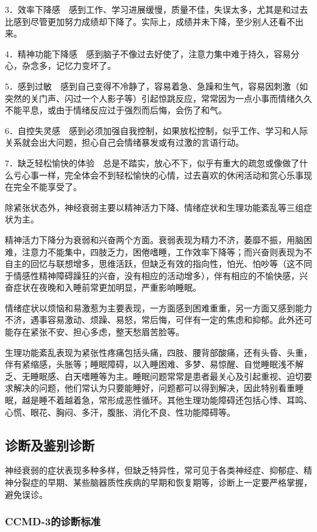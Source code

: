 3．效率下降感　感到工作、学习进展缓慢，质量不佳，失误太多，尤其是和过去比感到尽管更加努力成绩却下降了。实际上，成绩并未下降，至少别人还看不出来。

4．精神功能下降感　感到脑子不像过去好使了，注意力集中难于持久，容易分心，杂念多，记忆力变坏了。

5．感到过敏　感到自己变得不冷静了，容易着急、急躁和生气，容易因刺激（如突然的关门声、闪过一个人影子等）引起惊跳反应，常常因为一点小事而情绪久久不能平息，或由于情绪反应过于强烈而后悔，会伤了和气。

6．自控失灵感　感到必须加强自我控制，如果放松控制，似乎工作、学习和人际关系就会出大问题，担心自己会情绪暴发或有过激的言语行动。

7．缺乏轻松愉快的体验　总是不踏实，放心不下，似乎有重大的疏忽或像做了什么亏心事一样，完全体会不到轻松愉快的心情，过去喜欢的休闲活动和赏心乐事现在完全不能享受了。

除紧张状态外，神经衰弱主要以精神活力下降、情绪症状和生理功能紊乱等三组症状为主。

精神活力下降分为衰弱和兴奋两个方面。衰弱表现为精力不济，萎靡不振，用脑困难，注意力不能集中，四肢乏力，困倦嗜睡，工作效率下降等；而兴奋则表现为不自主的回忆与联想增多，思维活跃，但缺乏有效的指向性，怕光、怕吵等（这不同于情感性精神障碍躁狂的兴奋，没有相应的活动增多），伴有相应的不愉快感，兴奋症状在夜晚和入睡前常更加明显，严重影响睡眠。

情绪症状以烦恼和易激惹为主要表现，一方面感到困难重重，另一方面又感到能力不济，遇事容易激动、烦躁、易怒，常后悔，可伴有一定的焦虑和抑郁。此外还可能存在紧张不安、担心多虑，整天愁眉苦脸等。

生理功能紊乱表现为紧张性疼痛包括头痛，四肢、腰背部酸痛，还有头昏、头重，伴有紧缩感，头胀等；睡眠障碍，以入睡困难、多梦、易惊醒、自觉睡眠浅不解乏、无睡眠感、白天嗜睡等为主。睡眠问题常常是患者最关心及引起重视、迫切要求解决的问题，他们常认为只要能睡好，问题都可以得到解决，因此特别看重睡眠，越是睡不着越着急，常形成恶性循环。其他生理功能障碍还包括心悸、耳鸣、心慌、眼花、胸闷、多汗，腹胀、消化不良、性功能障碍等。

\subsection{诊断及鉴别诊断}

神经衰弱的症状表现多种多样，但缺乏特异性，常可见于各类神经症、抑郁症、精神分裂症的早期、某些脑器质性疾病的早期和恢复期等，诊断上一定要严格掌握，避免误诊。

\subsubsection{CCMD-3的诊断标准}

